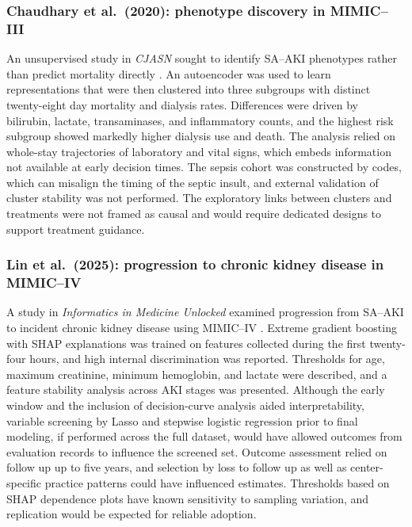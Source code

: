 \subsubsection{Chaudhary et al.\ (2020): phenotype discovery in MIMIC--III}
An unsupervised study in \emph{CJASN} sought to identify SA--AKI phenotypes rather than predict mortality directly \citep{Chaudhary_2020_CJASN}. An autoencoder was used to learn representations that were then clustered into three subgroups with distinct twenty-eight day mortality and dialysis rates. Differences were driven by bilirubin, lactate, transaminases, and inflammatory counts, and the highest risk subgroup showed markedly higher dialysis use and death. The analysis relied on whole-stay trajectories of laboratory and vital signs, which embeds information not available at early decision times. The sepsis cohort was constructed by codes, which can misalign the timing of the septic insult, and external validation of cluster stability was not performed. The exploratory links between clusters and treatments were not framed as causal and would require dedicated designs to support treatment guidance.

\subsubsection{Lin et al.\ (2025): progression to chronic kidney disease in MIMIC--IV}
A study in \emph{Informatics in Medicine Unlocked} examined progression from SA--AKI to incident chronic kidney disease using MIMIC--IV \citep{Lin_2025_IMU}. Extreme gradient boosting with SHAP explanations was trained on features collected during the first twenty-four hours, and high internal discrimination was reported. Thresholds for age, maximum creatinine, minimum hemoglobin, and lactate were described, and a feature stability analysis across AKI stages was presented. Although the early window and the inclusion of decision-curve analysis aided interpretability, variable screening by Lasso and stepwise logistic regression prior to final modeling, if performed across the full dataset, would have allowed outcomes from evaluation records to influence the screened set. Outcome assessment relied on follow up up to five years, and selection by loss to follow up as well as center-specific practice patterns could have influenced estimates. Thresholds based on SHAP dependence plots have known sensitivity to sampling variation, and replication would be expected for reliable adoption.

